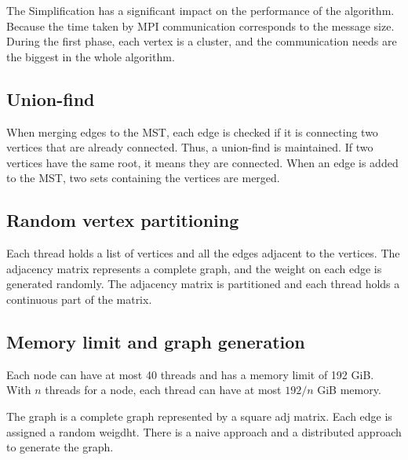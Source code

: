 \documentclass[english, 12pt, a4paper, elec, utf8, a-2b, online]{aaltothesis}
\begin{document}
The Simplification has a significant impact on the performance of the algorithm. Because the time taken by MPI communication corresponds to the message size. During the first phase, each vertex is a cluster, and the communication needs are the biggest in the whole algorithm. 




\subsection{Union-find}
When merging edges to the MST, each edge is checked if it is connecting two vertices that are already connected. Thus, a union-find is maintained. If two vertices have the same root, it means they are connected. When an edge is added to the MST, two sets containing the vertices are merged. 

\subsection{Random vertex partitioning}
Each thread holds a list of vertices and all the edges adjacent to the vertices. The adjacency matrix represents a complete graph, and the weight on each edge is generated randomly. The adjacency matrix is partitioned and each thread holds a continuous part of the matrix. 

\subsection{Memory limit and graph generation}
Each node can have at most 40 threads and has a memory limit of 192 GiB. With $n$ threads for a node, each thread can have at most $192/n$ GiB memory.

The graph is a complete graph represented by a square adj matrix. Each edge is assigned a random weigdht. There is a naive approach and a distributed approach to generate the graph.
\end{document}
